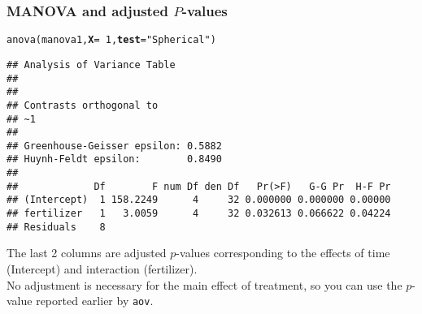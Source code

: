 \documentclass[color=usenames,dvipsnames]{beamer}\usepackage[]{graphicx}\usepackage[]{color}
\makeatletter
\newcommand{\hlnum}[1]{\textcolor[rgb]{0.69,0.494,0}{#1}}%
\newcommand{\hlstr}[1]{\textcolor[rgb]{0.749,0.012,0.012}{#1}}%
\newcommand{\hlopt}[1]{\textcolor[rgb]{0,0,0}{#1}}%
\newcommand{\hlstd}[1]{\textcolor[rgb]{0,0,0}{#1}}%
\newcommand{\hlkwc}[1]{\textcolor[rgb]{0,0,0}{\textbf{#1}}}%
\newcommand{\hlkwd}[1]{\textcolor[rgb]{0.004,0.004,0.506}{#1}}%
\newenvironment{kframe}{%
 \def\at@end@of@kframe{}%
 \ifinner\ifhmode%
  \def\at@end@of@kframe{\end{minipage}}%
  \begin{minipage}{\columnwidth}%
 \fi\fi%
 \def\FrameCommand##1{\hskip\@totalleftmargin \hskip-\fboxsep
 \colorbox{shadecolor}{##1}\hskip-\fboxsep
     \hskip-\linewidth \hskip-\@totalleftmargin \hskip\columnwidth}%
 \MakeFramed {\advance\hsize-\width
   \@totalleftmargin\z@ \linewidth\hsize
   \@setminipage}}%
 {\par\unskip\endMakeFramed%
 \at@end@of@kframe}
\newenvironment{knitrout}{}{} %
\newcommand{\inr}[1]{\colorbox{inlinecolor}{\texttt{#1}}}
\makeatother
\begin{document}
\begin{frame}[fragile]
  \frametitle{MANOVA and adjusted $P$-values}
\begin{knitrout}\scriptsize
{}\color{fgcolor}\begin{kframe}
\begin{alltt}
\hlkwd{anova}\hlstd{(manova1,} \hlkwc{X}\hlstd{=}\hlopt{~}\hlnum{1}\hlstd{,} \hlkwc{test}\hlstd{=}\hlstr{"Spherical"}\hlstd{)}
\end{alltt}
\begin{verbatim}
## Analysis of Variance Table
## 
## 
## Contrasts orthogonal to
## ~1
## 
## Greenhouse-Geisser epsilon: 0.5882
## Huynh-Feldt epsilon:        0.8490
## 
##             Df        F num Df den Df   Pr(>F)   G-G Pr  H-F Pr
## (Intercept)  1 158.2249      4     32 0.000000 0.000000 0.00000
## fertilizer   1   3.0059      4     32 0.032613 0.066622 0.04224
## Residuals    8
\end{verbatim}
\end{kframe}
\end{knitrout}
\pause
\footnotesize
  The last 2 columns are adjusted $p$-values corresponding to the
  effects of time (Intercept) and interaction (fertilizer). \\
  \pause
  \vfill
  No adjustment is necessary for the main effect of treatment,
  so you can use the $p$-value reported earlier by \inr{aov}. \\
\end{frame}
\end{document}
